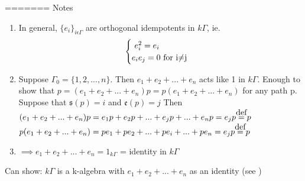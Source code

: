 \documentclass{amsart}
\numberwithin{equation}{section}
\theoremstyle{definition}
\newcommand{\G}{\Gamma}
\newcommand {\defeq}{\stackrel{\mathclap{\normalfont\mbox{def}}}{=}}
\begin{document}
=======
Notes
\begin{enumerate}
	\item  In general, $\{e_i\}_{i\epsilon\G}$ are orthogonal idempotents in $k\Gamma$, ie. 
	\[ \begin{cases}\text{\ $e_i^2 = e_i$}\notag\\
	\text{$e_ie_j = 0$ for i$\neq$j}\notag
	\end{cases}\]
	
	\item Suppose $\G_0 = \{1,2,...,n\}$. Then $e_1 + e_2 + ... + e_n$ acts like 1 in $k\G$. Enough to show that $p = (e_1 + e_2 + ... + e_n)p = p(e_1 + e_2 + ... + e_n)$ for any path p. Suppose that $\mathfrak{s}(p) = i$ and $\mathfrak{e}(p) = j$ Then
	\newline $(e_1 + e_2 + ... + e_n)p = e_1p + e_2p + ... + e_jp + ... + e_np = e_jp \defeq p$ \newline
	\newline $p(e_1 + e_2 + ... + e_n) = pe_1 + pe_2 + ... + pe_i + ... + pe_n = e_jp \defeq p$ \newline
	
	\item $\implies e_1 + e_2 + ... + e_n = 1_{k\G}$ = identity in $k\G$ 
\end{enumerate}

Can show: $k\G$ is a k-algebra with $e_1 + e_2 + ... + e_n$ as an identity (see \cite[page 50]{ARS})\newline
\end{document}
